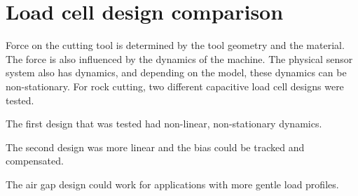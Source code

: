 \chapter{Load cell design comparison
\label{chap:8}}

Force on the cutting tool is determined by the tool geometry and the material.
The force is also influenced by the dynamics of the machine.
The physical sensor system also has dynamics, and depending on the model, 
these dynamics can be non-stationary.
For rock cutting, two different capacitive load cell designs were tested.

The first design that was tested had non-linear, non-stationary dynamics.

The second design was more linear and the bias could be tracked and compensated.

The air gap design could work for applications with more gentle load profiles.


